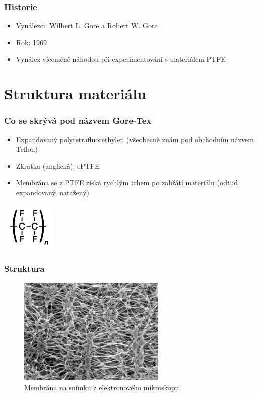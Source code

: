 
\begin{frame}
    \frametitle{Historie}
    \begin{itemize}
        \item Vynálezci: Wilbert L. Gore a Robert W. Gore 
        \item Rok: 1969
        \item Vynález víceméně náhodou při experimentování s materiálem PTFE
    \end{itemize}
\end{frame}

\section{Struktura materiálu}

\begin{frame}
    \frametitle{Co se skrývá pod názvem Gore-Tex \textregistered }
    \begin{itemize}
        \item Expandovaný polytetrafluorethylen (všeobecně znám pod obchodním názvem Teflon\textregistered)
        \item Zkratka (anglická): ePTFE %
        \item Membrána se z PTFE získá rychlým trhem po zahřátí materiálu (odtud expandovaný, natažený)

    \end{itemize}

    \includegraphics[width=0.2\textwidth]{Teflon_structure.PNG}


\end{frame}

\begin{frame}
    \frametitle{Struktura}
    \begin{figure}
        \begin{center}
            \includegraphics[width=200pt]{membrane_microscopy_small.jpg}
            \caption{Membrána na snímku z elektronového mikroskopu}
            \label{fig:membrana}
        \end{center}
    \end{figure}
\end{frame}

